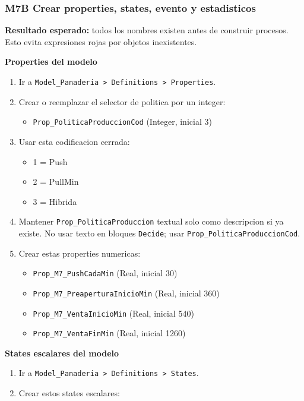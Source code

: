 \documentclass[11pt]{article}
\newcommand{\simio}[1]{\texttt{#1}}
\newcommand{\state}[1]{\texttt{#1}}
\begin{document}
\subsubsection{M7B Crear properties, states, evento y estadisticos}
\textbf{Resultado esperado:} todos los nombres existen antes de construir procesos. Esto evita expresiones rojas por objetos inexistentes.

\textbf{Properties del modelo}
\begin{enumerate}
  \item Ir a \simio{Model\_Panaderia > Definitions > Properties}.
  \item Crear o reemplazar el selector de politica por un integer:
  \begin{itemize}
    \item \state{Prop\_PoliticaProduccionCod} (Integer, inicial 3)
  \end{itemize}
  \item Usar esta codificacion cerrada:
  \begin{itemize}
    \item 1 = Push
    \item 2 = PullMin
    \item 3 = Hibrida
  \end{itemize}
  \item Mantener \state{Prop\_PoliticaProduccion} textual solo como descripcion si ya existe. No usar texto en bloques \simio{Decide}; usar \state{Prop\_PoliticaProduccionCod}.
  \item Crear estas properties numericas:
  \begin{itemize}
    \item \state{Prop\_M7\_PushCadaMin} (Real, inicial 30)
    \item \state{Prop\_M7\_PreaperturaInicioMin} (Real, inicial 360)
    \item \state{Prop\_M7\_VentaInicioMin} (Real, inicial 540)
    \item \state{Prop\_M7\_VentaFinMin} (Real, inicial 1260)
  \end{itemize}
\end{enumerate}

\textbf{States escalares del modelo}
\begin{enumerate}
  \item Ir a \simio{Model\_Panaderia > Definitions > States}.
  \item Crear estos states escalares:
\end{enumerate}
\end{document}
